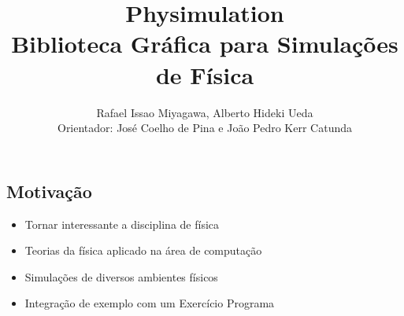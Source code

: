 \documentclass[plainboxedsections]{sciposter}
\title{Physimulation \\ Biblioteca Gráfica para Simulações de Física}
\author{Rafael Issao Miyagawa, Alberto Hideki Ueda\\ Orientador: José Coelho de Pina e João Pedro Kerr Catunda}
\institute{Instituto de Matemática e Estatística - Universidade de São Paulo}
\begin{document}
\maketitle

\renewcommand{\papertype}{a2}
\renewcommand{\sectionsize}{\Huge}

\begin{multicols}{2}

  \section*{Motivação}
  \fontsize{50pt}{15pt}\selectfont
  \begin{itemize}
    \item Tornar interessante a disciplina de física
    \item Teorias da física aplicado na área de computação
    \item Simulações de diversos ambientes físicos
    \item Integração de exemplo com um Exercício Programa
  \end{itemize}


\end{multicols}
\end{document}
